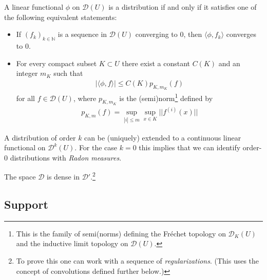 	\begin{property}
		A linear functional $\phi$ on $\mathcal{D}(U)$ is a distribution if and only if it satisfies one of the following equivalent statements:
		\begin{itemize}
			\item If $(f_k)_{k\in\mathbb{N}}$ is a sequence in $\mathcal{D}(U)$ converging to 0, then $\langle\phi,f_k\rangle$ converges to 0.
			\item For every compact subset $K\subset U$ there exist a constant $C(K)$ and an integer $m_K$ such that
			\begin{gather}
				|\langle\phi,f\rangle|\leq C(K)p_{K, m_K}(f)
			\end{gather}
			for all $f\in\mathcal{D}(U)$, where $p_{K, m_K}$ is the (semi)norm\footnote{This is the family of semi(norms) defining the Fr\'echet topology on $\mathcal{D}_K(U)$ and the inductive limit topology on $\mathcal{D}(U)$.} defined by
			\begin{gather}
                \label{distribution:D_seminorm}
				p_{K, m}(f) = \sup_{|i|\leq m}\sup_{x\in K}||f^{(i)}(x)||
			\end{gather}
		\end{itemize}
	\end{property}


	\begin{property}
		A distribution of order $k$ can be (uniquely) extended to a continuous linear functional on $\mathcal{D}^k(U)$. For the case $k=0$ this implies that we can identify order-0 distributions with \textit{Radon measures}.
	\end{property}

    \begin{property}
        The space $\mathcal{D}$ is dense in $\mathcal{D}'$.\footnote{To prove this one can work with a sequence of \textit{regularizations}. (This uses the concept of convolutions defined further below.)}
    \end{property}

\subsection{Support}

